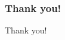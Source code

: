 \documentclass[10pt]{beamer}
\begin{document}


\begin{frame}

\frametitle{Thank you!}


\begin{center}
Thank you!
\end{center}




\end{frame}

\end{document}
